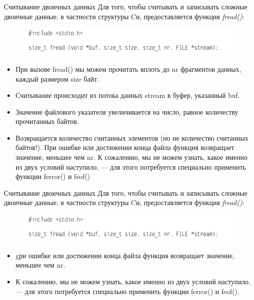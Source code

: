 \documentclass{beamer}
\begin{document}
\begin{frame}{Считывание двоичных данных}
Для того, чтобы считывать и записывать сложные двоичные данные, в частности структуры Cи, предоставляется функция \textit{fread()}:
\begin{figure}[h]
\centering
\includegraphics[scale=0.5]{images/lec05-pic15.png}
\end{figure}
\begin{itemize}
\item При вызове fread() мы можем прочитать вплоть до nr фрагментов данных, каждый размером size байт. 
\item Считывание происходит из потока данных stream в буфер, указанный buf. 
\item Значение файлового указателя увеличивается на число, равное количеству прочитанных байтов.
\item Возвращается количество считанных элементов (но не количество считанных
байтов!). 
При ошибке или достижении конца файла функция возвращает значение,
меньшее чем nr. К сожалению, мы не можем узнать, какое именно из двух условий
наступило, — для этого потребуется специально применить функции ferror() и feof()
\end{itemize}
\end{frame}

\begin{frame}{Считывание двоичных данных}
Для того, чтобы считывать и записывать сложные двоичные данные, в частности структуры Cи, предоставляется функция \textit{fread()}:
\begin{figure}[h]
\centering
\includegraphics[scale=0.5]{images/lec05-pic15.png}
\end{figure}
\begin{itemize}
\item gри ошибке или достижении конца файла функция возвращает значение, меньшее чем nr. 
\item К сожалению, мы не можем узнать, какое именно из двух условий наступило, — для этого потребуется специально применить функции ferror() и feof().
\end{itemize}
\end{frame}
\end{document}
